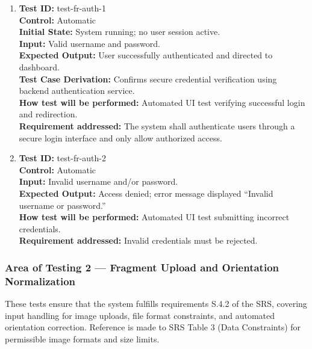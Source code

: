 \documentclass[12pt, titlepage]{article}
\begin{document}
\begin{enumerate}
\item 
\textbf{Test ID:} test-fr-auth-1\\
\textbf{Control:} Automatic\\
\textbf{Initial State:} System running; no user session active.\\
\textbf{Input:} Valid username and password.\\
\textbf{Expected Output:} User successfully authenticated and directed to dashboard.\\
\textbf{Test Case Derivation:} Confirms secure credential verification using backend authentication service.\\
\textbf{How test will be performed:} Automated UI test verifying successful login and redirection.\\
\textbf{Requirement addressed:} The system shall authenticate users through a secure login interface and only allow authorized access.\\

\item 
\textbf{Test ID:} test-fr-auth-2\\
\textbf{Control:} Automatic\\
\textbf{Input:} Invalid username and/or password.\\
\textbf{Expected Output:} Access denied; error message displayed ``Invalid username or password.''\\
\textbf{How test will be performed:} Automated UI test submitting incorrect credentials.\\
\textbf{Requirement addressed:} Invalid credentials must be rejected.\\
\end{enumerate}

\subsubsection{Area of Testing 2 — Fragment Upload and Orientation Normalization}

These tests ensure that the system fulfills requirements S.4.2 of the SRS, covering input handling for image uploads, file format constraints, and automated orientation correction. Reference is made to SRS Table 3 (Data Constraints) for permissible image formats and size limits.
\end{document}
